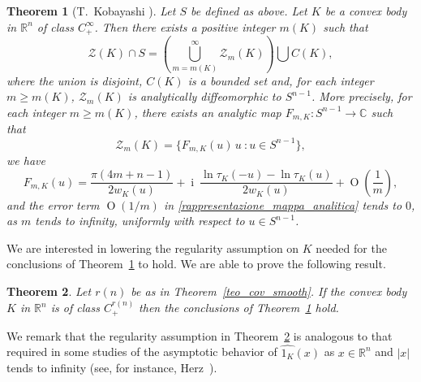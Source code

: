 \documentclass[a4paper]{amsart}
\newtheorem{theorem}{Theorem}[section]
\theoremstyle{definition}
\numberwithin{equation}{section}
\begin{document}
\begin{theorem}[T.~Kobayashi \cite{Kob1}]\label{teo_kobayashi} Let $S$ be defined as above. Let $K$ be a convex body in ${\mathbb{R}}^n$ of class  $C^\infty_+$. Then there exists  a positive integer $m(K)$ such that 
\[
 {{\mathcal Z}}(K)\cap S=\left( \bigcup_{m=m(K)}^\infty{{\mathcal Z}}_m(K) \right)\bigcup C(K),
\]
where the union is disjoint, $C(K)$ is a bounded set and, for each integer $m\geq m(K)$, ${{\mathcal Z}}_m(K)$ is analytically diffeomorphic to ${S^{n-1}}$.
More precisely, for each integer $m\geq m(K)$, there exists an analytic map $F_{m,K}:{S^{n-1}}\to{\mathbb{C}}$ such that
\begin{equation}\label{rappresentazione_Zm_con_Fm}
 {{\mathcal Z}}_m(K)=\{ F_{m,K}(u)\,u\ : u\in{S^{n-1}}\},
\end{equation}
we have
\begin{equation}\label{rappresentazione_mappa_analitica}
F_{m,K}(u)=\frac{\pi(4m+n-1)}{2w_K(u)}+{\operatorname{i}}\ \frac{\ln{\tau}_K(-u)-\ln{\tau}_K(u)}{2w_K(u)}+{{\operatorname{O}}}\left(\frac1{m}\right),
\end{equation}
and the error term ${{\operatorname{O}}}(1/m)$ in \eqref{rappresentazione_mappa_analitica} tends to $0$, as $m$ tends to infinity, uniformly with respect to $u\in {S^{n-1}}$.
\end{theorem}

We are interested in lowering the  regularity assumption on $K$ needed for the conclusions of Theorem~\ref{teo_kobayashi} to hold. We are able to prove the following result.

\begin{theorem}\label{teo_kobayashi_cm}Let ${{r(n)}}$ be as in Theorem~\ref{teo_cov_smooth}. If the convex body $K$ in ${\mathbb{R}}^n$ is of class $C^{{r(n)}}_+$ then the conclusions of Theorem~\ref{teo_kobayashi} hold.
\end{theorem}

We remark that the regularity assumption in Theorem~\ref{teo_kobayashi_cm} is analogous to that required in some studies of the asymptotic behavior of ${\widehat{{{1_K}}}}(x)$ as $x\in{\mathbb{R}}^n$  and $|x|$ tends to infinity (see, for instance, Herz~\cite{Herz-1962}).
\end{document}
